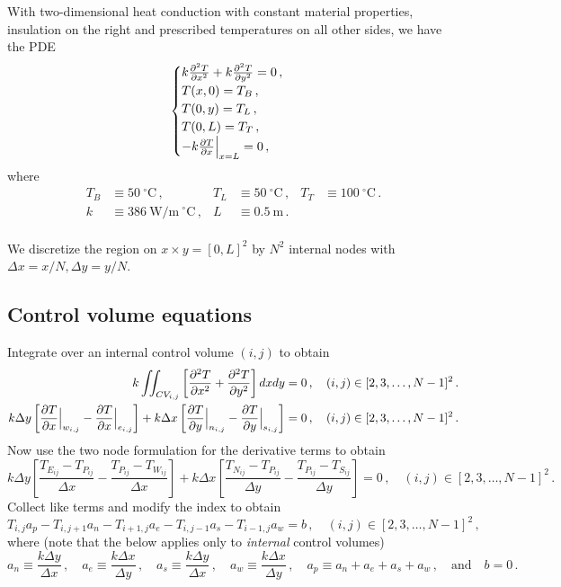 \documentclass{article}
\begin{document}
With two-dimensional heat conduction with constant material properties, insulation on the right and prescribed temperatures on all other sides, we have the PDE
\begin{equation}
	\begin{cases}
		k \pdv{^2T}{x^2} + k \pdv{^2T}{y^2} = 0\,,\\
		T(x, 0) = T_B\,,\\
		T(0, y) = T_L\,,\\
		T(0, L) = T_T\,,\\
		-k \pdv{T}{x} \Big|_{x = L} = 0\,,
	\end{cases}
\end{equation}
where
\begin{align*}
	T_B & \equiv 50~^\circ\text{C}\,, & T_L & \equiv 50~^\circ\text{C}\,, & T_T & \equiv 100~^\circ\text{C}\,.\\
	k & \equiv 386~\text{W/m}~^\circ\text{C}\,, & L & \equiv 0.5~\text{m}\,.\\
\end{align*}

We discretize the region on $x \times y = [0, L]^2$ by $N^2$ internal nodes with $\Delta x = x / N, \Delta y = y / N$.

\subsection*{Control volume equations}

Integrate over an internal control volume $(i,j)$ to obtain
\begin{align*}
	k \iint_{CV_{i, j}} \left[ \pdv{^2T}{x^2} + \pdv{^2T}{y^2} \right] dxdy & = 0\,, \quad (i, j) \in [2, 3, \ldots, N - 1]^2\,.\\
	k \Delta y \left[ \pdv{T}{x}\Big|_{w_{i,j}} - \pdv{T}{x}\Big|_{e_{i,j}} \right] + k \Delta x \left[ \pdv{T}{y}\Big|_{n_{i,j}} - \pdv{T}{y}\Big|_{s_{i,j}} \right] & = 0\,, \quad (i, j) \in [2, 3, \ldots, N - 1]^2\,.
\end{align*}
Now use the two node formulation for the derivative terms to obtain
\[
	k \Delta y \left[\frac{T_{E_{ij}} - T_{P_{ij}}}{\Delta x} - \frac{T_{P_{ij}} - T_{W_{ij}}}{\Delta x}\right] + k \Delta x \left[ \frac{T_{N_{ij}} - T_{P_{ij}}}{\Delta y} -\frac{T_{P_{ij}} - T_{S_{ij}}}{\Delta y} \right] = 0\,, \quad (i, j) \in [2, 3, \ldots, N - 1]^2\,.
\]
Collect like terms and modify the index to obtain
\begin{equation}
	\label{eq:internal}
	T_{i,j} a_p - T_{i, j+1} a_n - T_{i+1, j} a_e - T_{i, j-1} a_s - T_{i-1, j} a_w = b\,,\quad (i, j) \in [2, 3, \ldots, N - 1]^2\,,
\end{equation}
where (note that the below applies only to \textit{internal} control volumes)
\[
	a_n \equiv \frac{k \Delta y}{\Delta x}\,, \quad a_e \equiv \frac{k \Delta x}{\Delta y}\,, \quad a_s \equiv \frac{k\Delta y}{\Delta x}\,, \quad a_w \equiv \frac{k\Delta x}{\Delta y}\,, \quad a_p \equiv a_n + a_e + a_s + a_w\,, \quad \text{and} \quad b = 0\,.
\]
\end{document}
